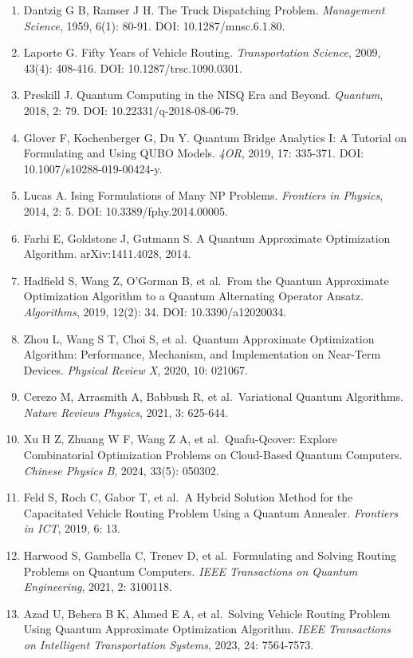 \documentclass[
  10.5pt,
  UTF8]{ctexart}
\providecommand{\tightlist}{%
  \setlength{\itemsep}{0pt}\setlength{\parskip}{0pt}}
\begin{document}
\begin{enumerate}
\def\labelenumi{\arabic{enumi}.}
\tightlist
\item
  Dantzig G B, Ramser J H. The Truck Dispatching Problem. \emph{Management Science}, 1959, 6(1): 80-91. DOI: 10.1287/mnsc.6.1.80.
\item
  Laporte G. Fifty Years of Vehicle Routing. \emph{Transportation Science}, 2009, 43(4): 408-416. DOI: 10.1287/trsc.1090.0301.
\item
  Preskill J. Quantum Computing in the NISQ Era and Beyond. \emph{Quantum}, 2018, 2: 79. DOI: 10.22331/q-2018-08-06-79.
\item
  Glover F, Kochenberger G, Du Y. Quantum Bridge Analytics I: A Tutorial on Formulating and Using QUBO Models. \emph{4OR}, 2019, 17: 335-371. DOI: 10.1007/s10288-019-00424-y.
\item
  Lucas A. Ising Formulations of Many NP Problems. \emph{Frontiers in Physics}, 2014, 2: 5. DOI: 10.3389/fphy.2014.00005.
\item
  Farhi E, Goldstone J, Gutmann S. A Quantum Approximate Optimization Algorithm. arXiv:1411.4028, 2014.
\item
  Hadfield S, Wang Z, O'Gorman B, et al.~From the Quantum Approximate Optimization Algorithm to a Quantum Alternating Operator Ansatz. \emph{Algorithms}, 2019, 12(2): 34. DOI: 10.3390/a12020034.
\item
  Zhou L, Wang S T, Choi S, et al.~Quantum Approximate Optimization Algorithm: Performance, Mechanism, and Implementation on Near-Term Devices. \emph{Physical Review X}, 2020, 10: 021067.
\item
  Cerezo M, Arrasmith A, Babbush R, et al.~Variational Quantum Algorithms. \emph{Nature Reviews Physics}, 2021, 3: 625-644.
\item
  Xu H Z, Zhuang W F, Wang Z A, et al.~Quafu-Qcover: Explore Combinatorial Optimization Problems on Cloud-Based Quantum Computers. \emph{Chinese Physics B}, 2024, 33(5): 050302.
\item
  Feld S, Roch C, Gabor T, et al.~A Hybrid Solution Method for the Capacitated Vehicle Routing Problem Using a Quantum Annealer. \emph{Frontiers in ICT}, 2019, 6: 13.
\item
  Harwood S, Gambella C, Trenev D, et al.~Formulating and Solving Routing Problems on Quantum Computers. \emph{IEEE Transactions on Quantum Engineering}, 2021, 2: 3100118.
\item
  Azad U, Behera B K, Ahmed E A, et al.~Solving Vehicle Routing Problem Using Quantum Approximate Optimization Algorithm. \emph{IEEE Transactions on Intelligent Transportation Systems}, 2023, 24: 7564-7573.

\end{enumerate}
\end{document}

